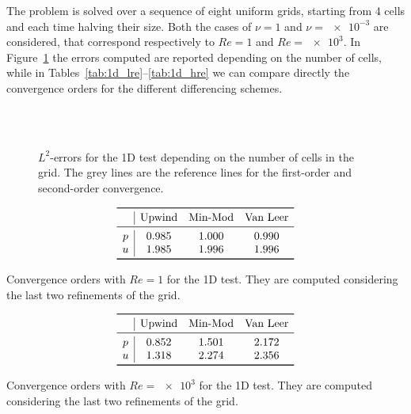 The problem is solved over a sequence of eight uniform grids, starting from 
4 cells and each time halving their size. Both the cases of $\nu=1$ 
and $\nu=\num{e-3}$ are considered, that correspond respectively to $Re=1$ and $Re=\num{e3}$. In Figure~\ref{fig:1d_err} the errors computed are reported 
depending on the number of cells, while in 
Tables~\ref{tab:1d_lre}--\ref{tab:1d_hre} we can compare directly the 
convergence orders for the different differencing schemes.
\begin{figure}
	\centering
	\subfloat[Upwind, $Re = 1$]{
		}
	\subfloat[Upwind, $Re = \num{e3}$]{
		}\\
	\subfloat[Min-Mod, $Re = 1$]{
		}
	\subfloat[Min-Mod, $Re = \num{e3}$]{
		}\\
	\subfloat[Van Leer, $Re = 1$]{
		}
	\subfloat[Van Leer, $Re = \num{e3}$]{
		}
	\caption[$L^2$-errors for the 1D test]{$L^2$-errors for the 1D test 
	depending on the number of cells in the grid. The grey lines are the 
	reference lines for the first-order and second-order convergence.}
	\label{fig:1d_err}
\end{figure}
\begin{table}
	\centering
	\[
	\begin{array}{c|ccc}
	\toprule
	& \text{Upwind} & \text{Min-Mod} & \text{Van Leer} \\ 
	\midrule
	p & 0.985 & 1.000 & 0.990\\
	u & 1.985 & 1.996 & 1.996\\
	\bottomrule
	\end{array}
	\]
	\caption[Convergence orders with $Re = 1$ for the 1D test]{Convergence 
	orders with $Re = 1$ for the 1D test. They are computed considering the 
	last two refinements of the grid.}
	\label{tab:1d_lre}
	\[
	\begin{array}{c|ccc}
	\toprule
	& \text{Upwind} & \text{Min-Mod} & \text{Van Leer} \\ 
	\midrule
	p & 0.852 & 1.501 & 2.172\\
	u & 1.318 & 2.274 & 2.356\\
	\bottomrule
	\end{array}
	\]
	\caption[Convergence orders with $Re = \num{e3}$ for the 1D 
	test]{Convergence orders with $Re = \num{e3}$ for the 1D test. They 
	are computed considering the last two refinements of the grid.}
	\label{tab:1d_hre}
\end{table}

